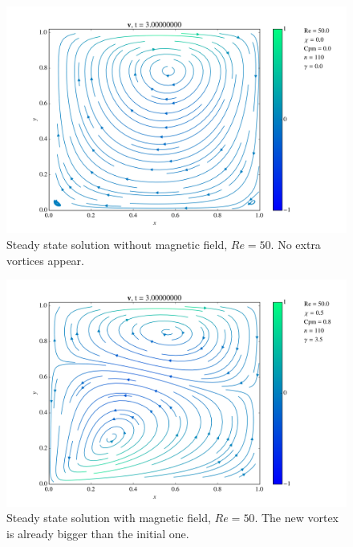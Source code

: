 \documentclass[journal]{IEEEtran}
\begin{document}
\begin{figure}[!t]
\centering
\includegraphics[width=\linewidth]{figures/Re050/n/vectorField}
\caption{Steady state solution without magnetic field, $\mathit{Re}=50$. No extra vortices appear. \label{Re050nVectorField}}
\end{figure}

\begin{figure}[!t]
\centering
\includegraphics[width=\linewidth]{figures/Re050/w/vectorField}
\caption{Steady state solution with magnetic field, $\mathit{Re}=50$. The new vortex is already bigger than the initial one. \label{Re050wVectorField}}
\end{figure}
\end{document}
